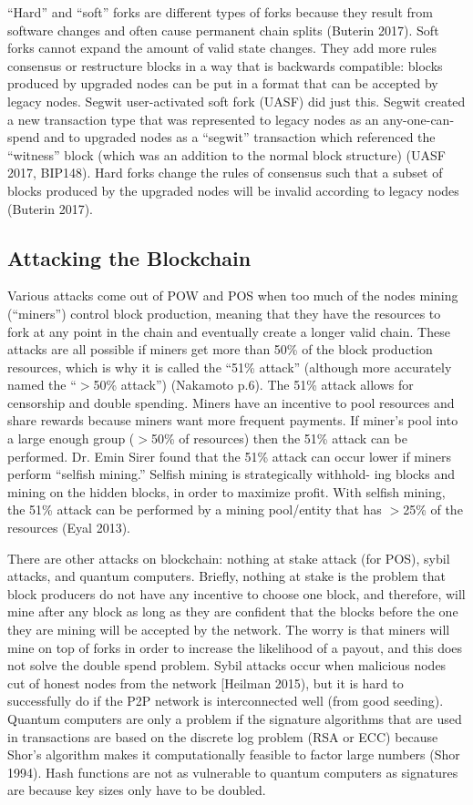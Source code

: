\documentclass[letterpaper, 10 pt, conference]{ieeeconf}  %
\begin{document}
“Hard” and “soft” forks are different types of forks because they result from software changes and often cause permanent chain splits (Buterin 2017). Soft forks cannot expand the amount of valid state changes. They add more rules consensus or restructure blocks in a way that is backwards compatible: blocks produced by upgraded nodes can be put in a format that can be accepted by legacy nodes. Segwit user-activated soft fork (UASF) did just this. Segwit created a new transaction type that was represented to legacy nodes as an any-one-can-spend and to upgraded nodes as a “segwit” transaction which referenced the “witness” block (which was an addition to the normal block structure) (UASF 2017, BIP148). Hard forks change the rules of consensus such that a subset of blocks produced by the upgraded nodes will be invalid according to legacy nodes (Buterin 2017). 

\subsection{Attacking the Blockchain}
Various attacks come out of POW and POS when too much of the nodes mining (“miners”) control block production, meaning that they have the resources to fork at any point in the chain and eventually create a longer valid chain. These attacks are all possible if miners get more than 50\% of the block production resources, which is why it is called the “51\% attack” (although more accurately named the “$>$50\% attack”) (Nakamoto p.6). The 51\% attack allows for censorship and double spending. Miners have an incentive to pool resources and share rewards because miners want more frequent payments. If miner’s pool into a large enough group ($>$50\% of resources) then the 51\% attack can be performed. Dr. Emin Sirer found that the 51\% attack can occur lower if miners perform “selfish mining.” Selfish mining is strategically withhold- ing blocks and mining on the hidden blocks, in order to maximize profit. With selfish mining, the 51\% attack can be performed by a mining pool/entity that has $>$25\% of the resources (Eyal 2013).

There are other attacks on blockchain: nothing at stake attack (for POS), sybil attacks, and quantum computers. Briefly, nothing at stake is the problem that block producers do not have any incentive to choose one block, and therefore, will mine after any block as long as they are confident that the blocks before the one they are mining will be accepted by the network. The worry is that miners will mine on top of forks in order to increase the likelihood of a payout, and this does not solve the double spend problem. Sybil attacks occur when malicious nodes cut of honest nodes from the network [Heilman 2015), but it is hard to successfully do if the P2P network is interconnected well (from good seeding). Quantum computers are only a problem if the signature algorithms that are used in transactions are based on the discrete log problem (RSA or ECC) because Shor’s algorithm makes it computationally feasible to factor large numbers (Shor 1994). Hash functions are not as vulnerable to quantum computers as signatures are because key sizes only have to be doubled. 
\end{document}
